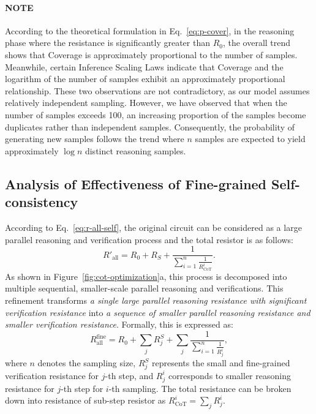 \paragraph{NOTE}
According to the theoretical formulation in Eq.~\ref{eq:p-cover}, in the reasoning phase where the resistance is significantly greater than \( R_0 \), the overall trend shows that Coverage is approximately proportional to the number of samples. Meanwhile, certain Inference Scaling Laws indicate that Coverage and the logarithm of the number of samples exhibit an approximately proportional relationship. These two observations are not contradictory, as our model assumes relatively independent sampling. However, we have observed that when the number of samples exceeds 100, an increasing proportion of the samples become duplicates rather than independent samples. Consequently, the probability of generating new samples follows the trend where \( n \) samples are expected to yield approximately \( \log n \) distinct reasoning samples.

\subsection{Analysis of Effectiveness of Fine-grained Self-consistency}\label{append:proof-fine}
According to Eq.~\ref{eq:r-all-self}, the original circuit can be considered as a large parallel reasoning and verification process and the total resistor is as follows:
\begin{equation}
    R'_{\text{all}} = R_0 + R_S + \frac{1}{\sum_{i=1}^n\frac{1}{R_{\text{CoT}}^i}}.
\end{equation}
As shown in Figure~\ref{fig:cot-optimization}a, this process is decomposed into multiple sequential, smaller-scale parallel reasoning and verifications. This refinement transforms \textit{a single large parallel reasoning resistance with significant verification resistance} into \textit{a sequence of smaller parallel reasoning resistance and smaller verification resistance}. Formally, this is expressed as:
\begin{equation}
    R^{\text{fine}}_{\text{all}} = R_0 + \sum_j R_j^S + \sum_j\frac{1}{\sum_{i=1}^n\frac{1}{R_j^{i}}},
\end{equation}
where $n$ denotes the sampling size, $ R_j^S $ represents the small and fine-grained verification resistance for $j$-th step, and $ R_j^{i} $ corresponds to smaller reasoning resistance for $j$-th step for $i$-th sampling. The total resistance can be broken down into resistance of sub-step resistor as $ R^i_{\text{CoT}} = \sum_j R_j^{i} $. 

